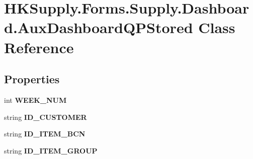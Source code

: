 \hypertarget{class_h_k_supply_1_1_forms_1_1_supply_1_1_dashboard_1_1_aux_dashboard_q_p_stored}{}\section{H\+K\+Supply.\+Forms.\+Supply.\+Dashboard.\+Aux\+Dashboard\+Q\+P\+Stored Class Reference}
\label{class_h_k_supply_1_1_forms_1_1_supply_1_1_dashboard_1_1_aux_dashboard_q_p_stored}
\subsection*{Properties}
\begin{DoxyCompactItemize}
\item 
\mbox{\label{class_h_k_supply_1_1_forms_1_1_supply_1_1_dashboard_1_1_aux_dashboard_q_p_stored_abe1dd33cd588e76c3caac29ceae5663c}} 
int {\bfseries W\+E\+E\+K\+\_\+\+N\+UM}
\item 
\mbox{\label{class_h_k_supply_1_1_forms_1_1_supply_1_1_dashboard_1_1_aux_dashboard_q_p_stored_adf0a06424f1068c3ce310fd5b699a430}} 
string {\bfseries I\+D\+\_\+\+C\+U\+S\+T\+O\+M\+ER}
\item 
\mbox{\label{class_h_k_supply_1_1_forms_1_1_supply_1_1_dashboard_1_1_aux_dashboard_q_p_stored_a1db3bec489f1a664b8dc1426f7d19609}} 
string {\bfseries I\+D\+\_\+\+I\+T\+E\+M\+\_\+\+B\+CN}
\item 
\mbox{\label{class_h_k_supply_1_1_forms_1_1_supply_1_1_dashboard_1_1_aux_dashboard_q_p_stored_a4eb91a3650ea16a05c1484c530d9fd10}} 
string {\bfseries I\+D\+\_\+\+I\+T\+E\+M\+\_\+\+G\+R\+O\+UP}

\end{DoxyCompactItemize}
